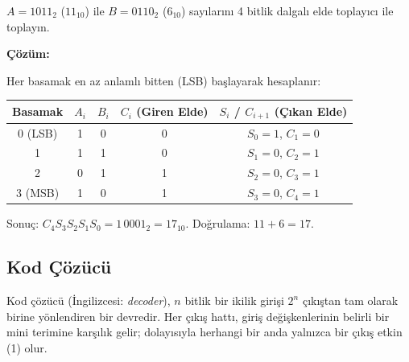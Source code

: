 \begin{ornek}[B.9]
$A = 1011_2$ ($11_{10}$) ile $B = 0110_2$ ($6_{10}$) sayılarını 4 bitlik dalgalı elde toplayıcı ile toplayın.

\textbf{Çözüm:}

Her basamak en az anlamlı bitten (LSB) başlayarak hesaplanır:

\begin{center}
\small
\begin{tabular}{ccccc}
\toprule
\textbf{Basamak} & $A_i$ & $B_i$ & $C_i$ (Giren Elde) & $S_i$ / $C_{i+1}$ (Çıkan Elde) \\
\midrule
0 (LSB) & 1 & 0 & 0 & $S_0 = 1$, \; $C_1 = 0$ \\
1       & 1 & 1 & 0 & $S_1 = 0$, \; $C_2 = 1$ \\
2       & 0 & 1 & 1 & $S_2 = 0$, \; $C_3 = 1$ \\
3 (MSB) & 1 & 0 & 1 & $S_3 = 0$, \; $C_4 = 1$ \\
\bottomrule
\end{tabular}
\end{center}

\noindent Sonuç: $C_4 S_3 S_2 S_1 S_0 = 1\,0001_2 = 17_{10}$. Doğrulama: $11 + 6 = 17$. \checkmark
\end{ornek}


\subsection{Kod Çözücü}

Kod çözücü (İngilizcesi: \emph{decoder}), $n$ bitlik bir ikilik girişi $2^n$ çıkıştan tam olarak birine yönlendiren bir devredir. Her çıkış hattı, giriş değişkenlerinin belirli bir mini terimine karşılık gelir; dolayısıyla herhangi bir anda yalnızca bir çıkış etkin (1) olur.

